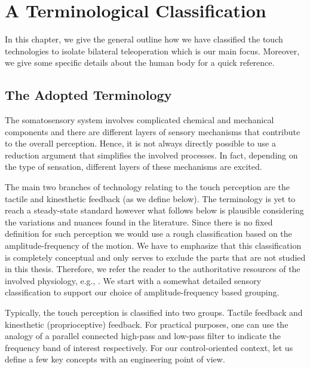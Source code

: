 \chapter{A Terminological Classification}
\label{chap:apdxphysio}

In this chapter, we give the general outline how we have classified the touch technologies to isolate bilateral teleoperation which is our main focus. Moreover, we give some specific details about the human body for a quick reference.


\section{The Adopted Terminology}

The somatosensory system involves complicated chemical and mechanical components and there are different layers of sensory mechanisms that contribute to the overall perception. Hence, it is not always directly possible to use a reduction argument that simplifies the involved processes. In fact, depending on the type of sensation, different layers of these mechanisms are excited.

The main two branches of technology relating to the touch perception are the tactile and kinesthetic feedback (as we define below). The terminology is yet to reach a steady-state standard however what follows below is plausible considering the variations and nuances found in the literature. Since there is no fixed definition for such perception we would use a rough  classification based on the amplitude-frequency of the motion. We have to emphasize that this classification is completely conceptual and only serves to exclude the parts that are not studied in this thesis. Therefore, we refer the reader to the authoritative resources of the involved physiology, e.g., \cite{kandel}. We start with a somewhat detailed sensory classification to support our choice of amplitude-frequency based grouping.

Typically, the touch perception is classified into two groups. Tactile feedback and kinesthetic (proprioceptive) feedback. For practical purposes, one can use the analogy of a parallel connected high-pass and low-pass filter to indicate the frequency band of interest respectively. For our control-oriented context, let us define a few key concepts with an engineering point of view. 

